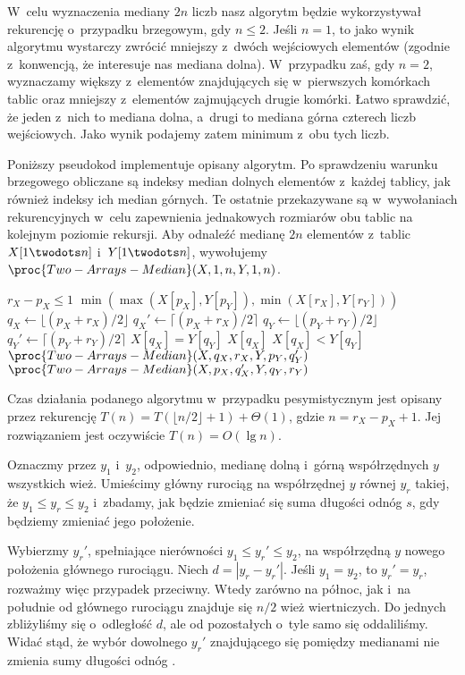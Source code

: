 W~celu wyznaczenia mediany $2n$ liczb nasz algorytm będzie wykorzystywał rekurencję o~przypadku brzegowym, gdy $n\le2$.
Jeśli $n=1$, to jako wynik algorytmu wystarczy zwrócić mniejszy z~dwóch wejściowych elementów (zgodnie z~konwencją, że interesuje nas mediana dolna).
W~przypadku zaś, gdy $n=2$, wyznaczamy większy z~elementów znajdujących się w~pierwszych komórkach tablic oraz mniejszy z~elementów zajmujących drugie komórki.
Łatwo sprawdzić, że jeden z~nich to mediana dolna, a~drugi to mediana górna czterech liczb wejściowych.
Jako wynik podajemy zatem minimum z~obu tych liczb.

Poniższy pseudokod implementuje opisany algorytm.
Po sprawdzeniu warunku brzegowego obliczane są indeksy median dolnych elementów z~każdej tablicy, jak również indeksy ich median górnych.
Te ostatnie przekazywane są w~wywołaniach rekurencyjnych w~celu zapewnienia jednakowych rozmiarów obu tablic na kolejnym poziomie rekursji.
Aby odnaleźć medianę $2n$ elementów z~tablic $X[1\twodots n]$ i~$Y[1\twodots n]$, wywołujemy $\proc{Two-Arrays-Median}(X,1,n,Y,1,n)$.

\begin{codebox}
\li	\If $r_X-p_X\le1$
\li		\Then \Return $\min(\max(X[p_X],Y[p_Y]),\min(X[r_X],Y[r_Y]))$
		\End
\li	$q_X\gets\lfloor(p_X+r_X)/2\rfloor$
\li	$q_X'\gets\lceil(p_X+r_X)/2\rceil$
\li	$q_Y\gets\lfloor(p_Y+r_Y)/2\rfloor$
\li	$q_Y'\gets\lceil(p_Y+r_Y)/2\rceil$
\li	\If $X[q_X]=Y[q_Y]$
\li		\Then \Return $X[q_X]$
		\End
\li	\If $X[q_X]<Y[q_Y]$
\li		\Then \Return $\proc{Two-Arrays-Median}(X,q_X,r_X,Y,p_Y,q_Y')$
\li		\Else \Return $\proc{Two-Arrays-Median}(X,p_X,q_X',Y,q_Y,r_Y)$
		\End
\end{codebox}

Czas działania podanego algorytmu w~przypadku pesymistycznym jest opisany przez rekurencję $T(n)=T(\lfloor n/2\rfloor+1)+\Theta(1)$, gdzie $n=r_X-p_X+1$.
Jej rozwiązaniem jest oczywiście $T(n)=O(\lg n)$.

\exercise %
Oznaczmy przez $y_1$ i~$y_2$, odpowiednio, medianę dolną i~górną współrzędnych $y$ wszystkich wież.
Umieścimy główny rurociąg na współrzędnej $y$ równej $y_r$ takiej, że $y_1\le y_r\le y_2$ i~zbadamy, jak będzie zmieniać się suma długości odnóg  $s$, gdy będziemy zmieniać jego położenie.

Wybierzmy $y_r'$, spełniające nierówności $y_1\le y_r'\le y_2$, na współrzędną $y$ nowego położenia głównego rurociągu.
Niech $d=|y_r-y_r'|$.
Jeśli $y_1=y_2$, to $y_r'=y_r$, rozważmy więc przypadek przeciwny.
Wtedy zarówno na północ, jak i~na południe od głównego rurociągu znajduje się $n/2$ wież wiertniczych.
Do jednych zbliżyliśmy się o~odległość $d$, ale od pozostałych o~tyle samo się oddaliliśmy.
Widać stąd, że wybór dowolnego $y_r'$ znajdującego się pomiędzy medianami nie zmienia sumy długości odnóg .

